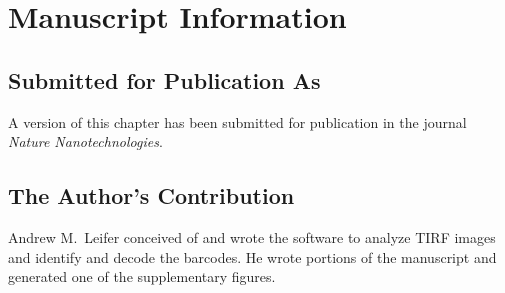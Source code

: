 \section{Manuscript Information}
\subsection{Submitted for Publication As}
A version of this chapter has been submitted for publication in the journal \textit{Nature Nanotechnologies}.

\subsection{The Author's Contribution}
Andrew M.~Leifer conceived of and wrote the software to analyze TIRF images and identify and decode the barcodes. He wrote portions of the manuscript and generated one of the supplementary figures. 